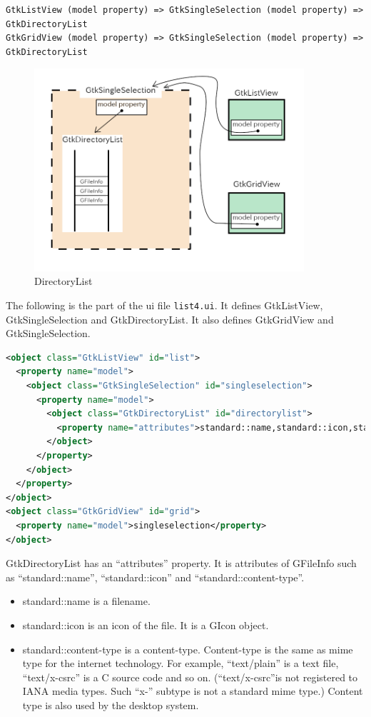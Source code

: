 \begin{lstlisting}
GtkListView (model property) => GtkSingleSelection (model property) => GtkDirectoryList
GtkGridView (model property) => GtkSingleSelection (model property) => GtkDirectoryList
\end{lstlisting}

\begin{figure}
\centering
\includegraphics[width=10cm,height=7.5cm]{../image/directorylist.png}
\caption{DirectoryList}
\end{figure}

The following is the part of the ui file
\passthrough{\lstinline!list4.ui!}. It defines GtkListView,
GtkSingleSelection and GtkDirectoryList. It also defines GtkGridView and
GtkSingleSelection.

\begin{lstlisting}[language=XML]
<object class="GtkListView" id="list">
  <property name="model">
    <object class="GtkSingleSelection" id="singleselection">
      <property name="model">
        <object class="GtkDirectoryList" id="directorylist">
          <property name="attributes">standard::name,standard::icon,standard::content-type</property>
        </object>
      </property>
    </object>
  </property>
</object>
<object class="GtkGridView" id="grid">
  <property name="model">singleselection</property>
</object>
\end{lstlisting}

GtkDirectoryList has an ``attributes'' property. It is attributes of
GFileInfo such as ``standard::name'', ``standard::icon'' and
``standard::content-type''.

\begin{itemize}
\tightlist
\item
  standard::name is a filename.
\item
  standard::icon is an icon of the file. It is a GIcon object.
\item
  standard::content-type is a content-type. Content-type is the same as
  mime type for the internet technology. For example, ``text/plain'' is
  a text file, ``text/x-csrc'' is a C source code and so on.
  (``text/x-csrc''is not registered to IANA media types. Such ``x-''
  subtype is not a standard mime type.) Content type is also used by the
  desktop system.
\end{itemize}

